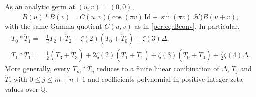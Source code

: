 \begin{theorem}
\label{per:thm:reflectedgenerator}
As an analytic germ at $(u,v)=(0,0)$,
\begin{equation}\label{per:eq:Brefconv}
 B(u)*\check{B(v)}
 =C(u,v)\bigl(\cos(\pi v)\,\mathrm{Id}
                    +\sin(\pi v)\,\mathcal H\bigr)B(u+v),
\end{equation}
with the same Gamma quotient $C(u,v)$ as in \eqref{per:eq:Bconv}.
In particular,
\begin{align}
 T_0*\check T_1={}&\tfrac12T_2+\check T_2
                +\zeta(2)(T_0+\check T_0)+\zeta(3)\Delta,
 \label{per:eq:T0refT1}\\
 T_1*\check T_1={}&\tfrac12(T_3+\check T_3)
                +2\zeta(2)(T_1+\check T_1)
                +\zeta(3)(T_0+\check T_0)
                +\tfrac72\zeta(4)\Delta.
 \label{per:eq:T1refT1}
\end{align}
More generally, every $T_m*\check T_n$ reduces to a finite linear
combination of $\Delta$, $T_j$ and $\check T_j$ with
$0\le j\le m+n+1$ and coefficients polynomial in positive integer
zeta values over $\mathbb Q$.
\end{theorem}

